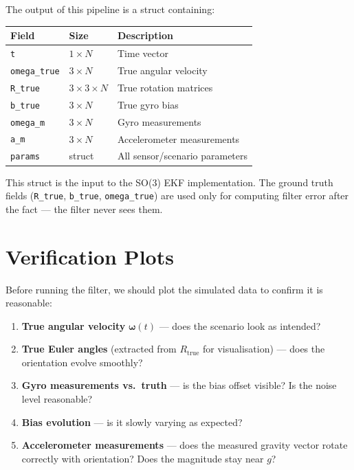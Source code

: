 \documentclass[11pt,letterpaper]{article}
\begin{document}
\bigskip

The output of this pipeline is a struct containing:

\begin{center}
\begin{tabular}{llp{6cm}}
\toprule
\textbf{Field} & \textbf{Size} & \textbf{Description} \\
\midrule
\texttt{t} & $1 \times N$ & Time vector \\
\texttt{omega\_true} & $3 \times N$ & True angular velocity \\
\texttt{R\_true} & $3 \times 3 \times N$ & True rotation matrices \\
\texttt{b\_true} & $3 \times N$ & True gyro bias \\
\texttt{omega\_m} & $3 \times N$ & Gyro measurements \\
\texttt{a\_m} & $3 \times N$ & Accelerometer measurements \\
\texttt{params} & struct & All sensor/scenario parameters \\
\bottomrule
\end{tabular}
\end{center}

This struct is the input to the SO(3) EKF implementation.  The
ground truth fields (\texttt{R\_true}, \texttt{b\_true},
\texttt{omega\_true}) are used only for computing filter error
after the fact --- the filter never sees them.

\section{Verification Plots}

Before running the filter, we should plot the simulated data to
confirm it is reasonable:

\begin{enumerate}[nosep]
  \item \textbf{True angular velocity} $\bm{\omega}(t)$ --- does
    the scenario look as intended?
  \item \textbf{True Euler angles} (extracted from $R_{\mathrm{true}}$
    for visualisation) --- does the orientation evolve smoothly?
  \item \textbf{Gyro measurements vs.\ truth} --- is the bias
    offset visible?  Is the noise level reasonable?
  \item \textbf{Bias evolution} --- is it slowly varying as
    expected?
  \item \textbf{Accelerometer measurements} --- does the measured
    gravity vector rotate correctly with orientation?  Does the
    magnitude stay near $g$?
\end{enumerate}
\end{document}
